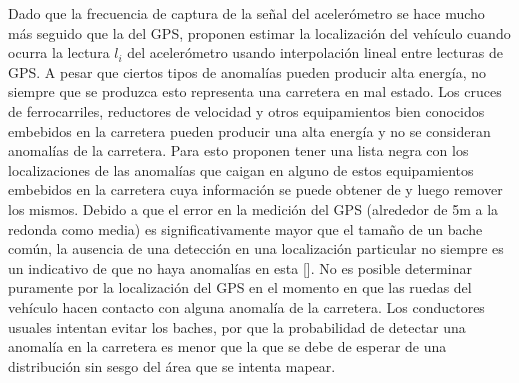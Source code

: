 

		
			Dado que la frecuencia de captura de la señal del acelerómetro se hace mucho más seguido que la del GPS,
		proponen estimar la localización del vehículo cuando ocurra la lectura $l_i$ del acelerómetro usando interpolación lineal entre lecturas
		de GPS. A pesar que ciertos tipos de anomalías pueden producir alta energía, no siempre que se produzca esto representa una carretera en
		mal estado. Los cruces de ferrocarriles, reductores de velocidad y otros equipamientos bien conocidos embebidos en la carretera pueden
		producir una alta energía y no se consideran anomalías de la carretera. Para esto proponen tener una lista negra con los localizaciones
		de las anomalías que caigan en alguno de estos equipamientos embebidos en la carretera cuya información se puede obtener de y luego
		remover los mismos. Debido a que el error en la medición del GPS (alrededor de 5m a la redonda como media) es significativamente mayor
		que el tamaño de un bache común, la ausencia de una detección en una localización particular no siempre es un indicativo de que no haya
		anomalías en esta []. No es posible determinar puramente por la localización del GPS en el momento en que las ruedas del vehículo hacen
		contacto con alguna anomalía de la carretera. Los conductores usuales intentan evitar los baches, por que la probabilidad de detectar una
		anomalía en la carretera es menor que la que se debe de esperar de una distribución sin sesgo del área que se intenta mapear.\\


